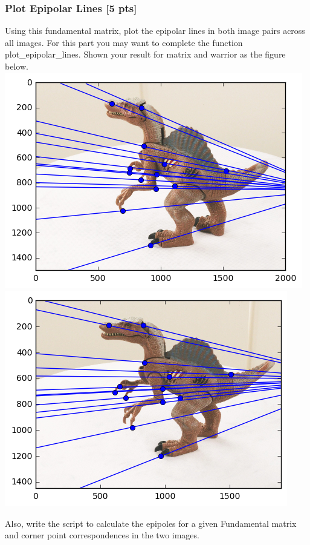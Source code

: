 \documentclass[11pt]{article}
\begin{document}
    \hypertarget{plot-epipolar-lines-5-pts}{%
\subsubsection{Plot Epipolar Lines {[}5
pts{]}}\label{plot-epipolar-lines-5-pts}}

Using this fundamental matrix, plot the epipolar lines in both image
pairs across all images. For this part you may want to complete the
function plot\_epipolar\_lines. Shown your result for matrix and warrior
as the figure below. \includegraphics{fig/dinoEpi1.png}
\includegraphics{fig/dinoEpi2.png}

Also, write the script to calculate the epipoles for a given Fundamental
matrix and corner point correspondences in the two images.
\end{document}
